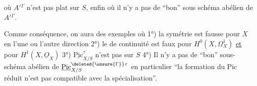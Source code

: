 où $A'{}^\Gamma$ n'est pas plat sur $S$, enfin où il n'y a pas de ``bon'' sous schéma abélien de $A'{}^\Gamma$.

Comme conséquence, on aura des exemples où 1°) la symétrie est fausse pour $X$ en l'une ou l'autre direction 2°) le  de continuité est faux pour $H^0(X,\Omega^1_X)$ \uline{et} pour $H^1(X,\underline{O}_X)$ 3°) $\underline{\mathrm{Pic}}^\tau_{X/S}$ n'est pas  sur $S$ 4°) Il n'y a pas de ``bon'' sous-schéma abélien de $\underline{\mathrm{Pic}}^{\deleted{\unsure{\Gamma}}\tau}_{X/S}$ en particulier ``la formation du Pic réduit n'est pas compatible avec la spécialisation''.


